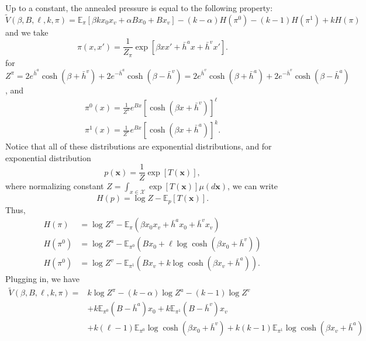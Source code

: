 \documentclass[12pt]{article}
\numberwithin{equation}{section}
\begin{document}
Up to a constant, the annealed pressure is equal to the following property:
\begin{equation*}
    \widetilde{V}(\beta, B, \ell, k, \pi) = \mathbb{E}_{\pi}\left[\beta k x_0 x_v + \alpha Bx_0 + B x_v\right] - (k-\alpha)H(\pi^0) - (k-1)H(\pi^1) + kH(\pi)
\end{equation*}
and we take
\begin{equation*}
    \pi(x, x') = \frac1{Z_\pi} \exp\left[\beta xx' + \bar{h}^a x + \bar{h}^v x'\right].
\end{equation*}
for $Z^\pi = 2e^{\bar{h}^a}\cosh(\beta + \bar{h}^v) + 2e^{-\bar{h}^a}\cosh(\beta - \bar{h}^v) = 2e^{\bar{h}^v}\cosh(\beta + \bar{h}^a) + 2e^{-\bar{h}^v}\cosh(\beta - \bar{h}^a)$,
and
\begin{equation*}
    \begin{aligned}
        \pi^0(x) = \frac1{Z^a}e^{Bx}[\cosh(\beta x + \bar{h}^v)]^\ell \\
        \pi^1(x) = \frac1{Z^v}e^{Bx}[\cosh(\beta x + \bar{h}^a)]^k.
    \end{aligned}
\end{equation*}
Notice that all of these distributions are exponential distributions, and for exponential distribution
\begin{equation*}
    p(\mathbf{x}) = \frac1Z \exp[T(\mathbf{x})],
\end{equation*}
where normalizing constant $Z = \int_{x\in\mathcal{X}} \exp[T(\mathbf{x})] \mu(d\mathbf{x})$,
we can write
\begin{equation*}
    H(p) = \log Z - \mathbb{E}_p [T(\mathbf{x})].
\end{equation*}
Thus,
\begin{align*}
    H(\pi)   & = \log Z^\pi - \mathbb{E}_\pi (\beta x_0 x_v + \bar{h}^a x_0 + \bar{h}^v x_v)    \\
    H(\pi^0) & = \log Z^a - \mathbb{E}_{\pi^0} (Bx_0 + \ell \log \cosh (\beta x_0 + \bar{h}^v)) \\
    H(\pi^0) & = \log Z^v - \mathbb{E}_{\pi^1} (Bx_v + k \log \cosh (\beta x_v + \bar{h}^a)).
\end{align*}
Plugging in, we have
\begin{align*}
    \widetilde{V}(\beta, B, \ell, k, \pi) = & k \log Z^\pi - (k-\alpha) \log Z^a - (k-1)\log Z^v                                  \\
                                            & + k\mathbb{E}_{\pi^0} (B - \bar{h}^a) x_0 + k\mathbb{E}_{\pi^1} (B - \bar{h}^v) x_v \\
                                            & + k (\ell - 1) \mathbb{E}_{\pi^0} \log\cosh(\beta x_0 + \bar{h}^v)
    + k (k - 1) \mathbb{E}_{\pi^1} \log\cosh(\beta x_v + \bar{h}^a)
\end{align*}
\end{document}
